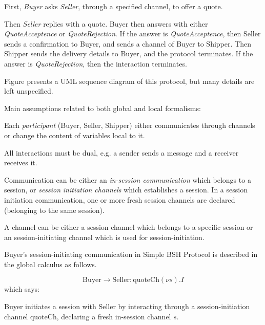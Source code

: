 \begin{compactenum}
\item  First, \textit{Buyer} asks \textit{Seller}, through a specified channel, to offer a quote.
\item  Then \textit{Seller} replies with a quote. Buyer then answers with either \textit{QuoteAcceptence} or \textit{QuoteRejection}. If the answer is \textit{QuoteAcceptence}, then Seller sends a confirmation to Buyer, and sends a channel of Buyer to Shipper. Then Shipper sends the delivery details to Buyer, and the protocol terminates. If the answer is \textit{QuoteRejection}, then the interaction terminates.
\end{compactenum}

Figure \label{simple-bsh} presents a UML sequence diagram of this protocol, but many details are left unspecified.

Main assumptions related to both global and local formalisms:
\begin{compactenum}
\item  Each \textit{participant} (Buyer, Seller, Shipper) either communicates through channels or change the content of variables local to it.

\item  All interactions must be dual, e.g. a sender sends a  message and a receiver receives it.

\item  Communication can be either an \textit{in-session communication} which belongs to a session, or \textit{session} \textit{initiation channels} which establishes a session. In a session initiation communication, one or more fresh session channels are declared (belonging to the same session).

\item  A channel can be either a session channel which belongs to a specific session or an session-initiating channel which is used for session-initiation.
\end{compactenum}

Buyer's session-initiating communication in Simple BSH Protocol is described in the global calculus as follows.

\begin{equation}
\text{Buyer} \rightarrow \text{Seller} : \text{quoteCh}(\nu s).I
\label{eq:simple-bsh}
\end{equation}
which says:

Buyer initiates a session with Seller by interacting through a session-initiation channel quoteCh, declaring a fresh in-session channel $s$.

